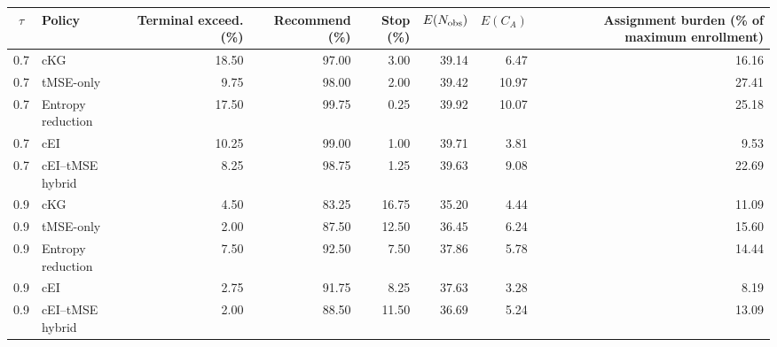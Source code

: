 \begin{tabular}{clrrrrrr}
\toprule
$\tau$ & Policy & Terminal exceed. (\%) & Recommend (\%) & Stop (\%) & $E(N_{\rm obs})$ & $E(C_A)$ & Assignment burden (\% of maximum enrollment) \\
\midrule
0.7 & cKG & 18.50 & 97.00 & 3.00 & 39.14 & 6.47 & 16.16 \\
0.7 & tMSE-only & 9.75 & 98.00 & 2.00 & 39.42 & 10.97 & 27.41 \\
0.7 & Entropy reduction & 17.50 & 99.75 & 0.25 & 39.92 & 10.07 & 25.18 \\
0.7 & cEI & 10.25 & 99.00 & 1.00 & 39.71 & 3.81 & 9.53 \\
0.7 & cEI--tMSE hybrid & 8.25 & 98.75 & 1.25 & 39.63 & 9.08 & 22.69 \\
0.9 & cKG & 4.50 & 83.25 & 16.75 & 35.20 & 4.44 & 11.09 \\
0.9 & tMSE-only & 2.00 & 87.50 & 12.50 & 36.45 & 6.24 & 15.60 \\
0.9 & Entropy reduction & 7.50 & 92.50 & 7.50 & 37.86 & 5.78 & 14.44 \\
0.9 & cEI & 2.75 & 91.75 & 8.25 & 37.63 & 3.28 & 8.19 \\
0.9 & cEI--tMSE hybrid & 2.00 & 88.50 & 11.50 & 36.69 & 5.24 & 13.09 \\
\bottomrule
\end{tabular}
